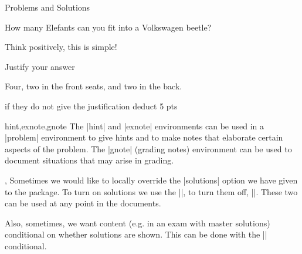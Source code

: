 \begin{sfragment}{Problems and Solutions}
{  \begin{sproblem}[id=elefants,pts=10,min=2,title=Fitting Elefants]
    How many Elefants can you fit into a Volkswagen beetle?
    \begin{hint}
      Think positively, this is simple!
    \end{hint}
    \begin{exnote}
      Justify your answer
    \end{exnote}
\begin{solution}[for=elefants]
  Four, two in the front seats, and two in the back.
  \begin{gnote}
    if they do not give the justification deduct 5 pts
  \end{gnote}
\end{solution}
\end{sproblem}

}


\begin{environment}{hint,exnote,gnote}
  The |hint| and |exnote| environments can be used in a |problem| environment to give
  hints and to make notes that elaborate certain aspects of the problem.  The |gnote|
  (grading notes) environment can be used to document situations that may arise in
  grading.
\end{environment}

\begin{function}{\startsolutions,\stopsolutions}
  Sometimes we would like to locally override the |solutions| option we have given to the
  package. To turn on solutions we use the |\startsolutions|, to turn them off,
  |\stopsolutions|. These two can be used at any point in the documents.
\end{function}

\begin{function}{\ifsolutions}
  Also, sometimes, we want content (e.g. in an exam with master solutions) conditional on
  whether solutions are shown. This can be done with the |\ifsolutions| conditional.
\end{function}
\end{sfragment}

